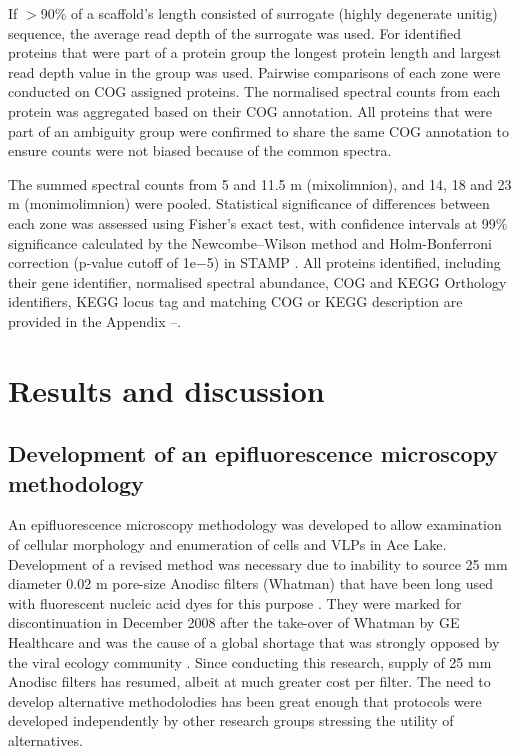 If $>$90\% of a scaffold’s length consisted of surrogate (highly degenerate unitig) sequence, the average read depth of the surrogate was used. 
For identified proteins that were part of a protein group the longest protein length and largest read depth value in the group was used. 
Pairwise comparisons of each zone were conducted on \ac{COG} assigned proteins. 
The normalised spectral counts from each protein was aggregated based on their \ac{COG} annotation. 
All proteins that were part of an ambiguity group were confirmed to share the same \ac{COG} annotation to ensure counts were not biased because of the common spectra.

The summed spectral counts from 5 and 11.5 m (mixolimnion), and 14, 18 and 23 m (monimolimnion) were pooled. 
Statistical significance of differences between each zone was assessed using Fisher's exact test, with confidence intervals at 99\% significance calculated by the Newcombe–Wilson method and Holm-Bonferroni correction (p-value cutoff of 1e$-$5) in \ac{STAMP} \cite{Parks2010}. 
All proteins identified, including their gene identifier, normalised spectral abundance, \ac{COG} and \ac{KEGG} Orthology identifiers, \ac{KEGG} locus tag and matching \ac{COG} or \ac{KEGG} description are provided in the Appendix --.




\section{Results and discussion}

\subsection[Development of an epifluorescence microscopy methodology]{Development of an epifluorescence microscopy methodology}
An epifluorescence microscopy methodology was developed to allow examination of cellular morphology and enumeration of cells and \acp{VLP} in Ace Lake.
Development of a revised method was necessary due to inability to source 25 mm diameter 0.02 \textmu{}m pore-size Anodisc filters (Whatman) that have been long used with fluorescent nucleic acid dyes for this purpose \cite{Hennes1995, Noble1998, Patel2007}. 
They were marked for discontinuation in December 2008 after the take-over of Whatman by \textsc{GE} Healthcare and was the cause of a global shortage that was strongly opposed by the viral ecology community \cite{Torrice2009}.
Since conducting this research, supply of 25 mm Anodisc filters has resumed, albeit at much greater cost per filter. 
The need to develop alternative methodolodies has been great enough that protocols were developed independently by other research groups \cite{Budinoff2011, Diemer2012} stressing the utility of alternatives.

